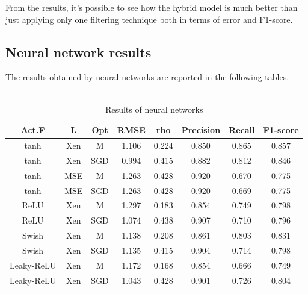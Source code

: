 \documentclass{article}
\begin{document}
From the results, it's possible to see how the hybrid model is much better than just applying only one filtering technique both in terms of error and F1-score.
\newpage
\subsection{Neural network results}

The results obtained by neural networks are reported in the following tables.\\ \\

\begin{table}[h]
      \begin{tabular}{ | c | c | c | c | c | c | c | c |} 
        \hline
        \rowcolor{lightgray} Act.F & L & Opt & RMSE & rho & Precision & Recall & F1-score \\ 
        \hline
        \cellcolor{lightgray} tanh & Xen & M & 1.106
            & 0.224 & 0.850 & 0.865 & 0.857 \\ 
        \hline
        \cellcolor{lightgray} tanh & Xen & SGD & 0.994
            & 0.415 & 0.882 & 0.812 & 0.846 \\ 
        \hline
        \cellcolor{lightgray} tanh & MSE & M & 1.263
            & 0.428 & 0.920 & 0.670 & 0.775 \\ 
        \hline
        \cellcolor{lightgray} tanh & MSE & SGD & 1.263
            & 0.428 & 0.920 & 0.669 & 0.775 \\ 
        \hline
        \cellcolor{lightgray} ReLU & Xen & M & 1.297
            & 0.183 & 0.854 & 0.749 & 0.798 \\ 
        \hline
        \cellcolor{lightgray} ReLU & Xen & SGD & 1.074
            & 0.438 & 0.907 & 0.710 & 0.796 \\ 
        \hline
        \cellcolor{lightgray} Swish & Xen & M & 1.138
            & 0.208 & 0.861 & 0.803 & 0.831 \\ 
        \hline
        \cellcolor{lightgray} Swish & Xen & SGD & 1.135
            & 0.415 & 0.904 & 0.714 & 0.798 \\ 
        \hline
        \cellcolor{lightgray} Leaky-ReLU & Xen & M & 1.172
            & 0.168 & 0.854 & 0.666 & 0.749 \\ 
        \hline
        \cellcolor{lightgray} Leaky-ReLU & Xen & SGD &        1.043 & 0.428 & 0.901 & 0.726 & 0.804 \\ 
        \hline
      \end{tabular}
    \caption{Results of neural networks}
    \label{FilteringResultsNN}
\end{table}
\end{document}

